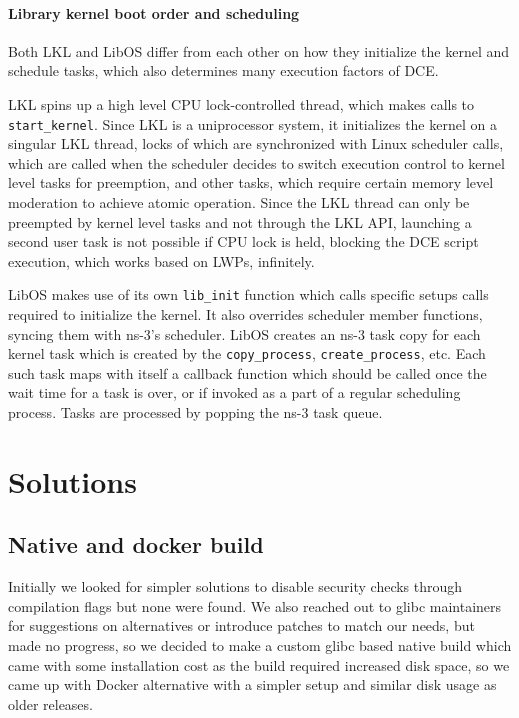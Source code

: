 \documentclass{sig-alternate}
\begin{document}
\paragraph{Library kernel boot order and scheduling}
Both LKL and LibOS differ from each other on how they initialize the kernel and schedule tasks, which also determines many execution factors of DCE. 

LKL spins up a high level CPU lock-controlled thread, which makes calls to \texttt{start\_kernel}. Since LKL is a uniprocessor system, it initializes 
the kernel on a singular LKL thread, 
locks of which are synchronized with Linux scheduler calls, which are called when the scheduler decides to switch execution control 
to kernel level tasks for preemption, and other tasks, which require certain memory level moderation to achieve
atomic operation. Since the LKL thread can only be preempted by kernel level tasks and not through the LKL API, launching a second user task is not possible if 
CPU lock is held, blocking the DCE script execution, which works based on LWPs, infinitely.

LibOS makes 
use of its own \texttt{lib\_init} function which calls specific setups calls required to initialize the kernel.
It also overrides scheduler member functions, syncing them with ns-3's 
scheduler. LibOS creates an ns-3 task copy for each kernel task which is created by the \texttt{copy\_process}, \texttt{create\_process},
etc. Each such task maps with itself a callback function which should be called once the wait time
for a task is over, or if invoked as a part of a regular scheduling process. Tasks are processed by popping the ns-3 task queue.

\section{Solutions}
\label{section:design}

\subsection{Native and docker build}
Initially we looked for simpler solutions to disable security checks through compilation flags but none were found. We also reached out to glibc maintainers for 
suggestions on alternatives or introduce patches to match our needs, but made no progress, so we decided to make a custom glibc based native build which came with some
installation cost as the build required increased disk space, so we came up with Docker alternative with a simpler setup and similar disk usage as older releases.
\end{document}
